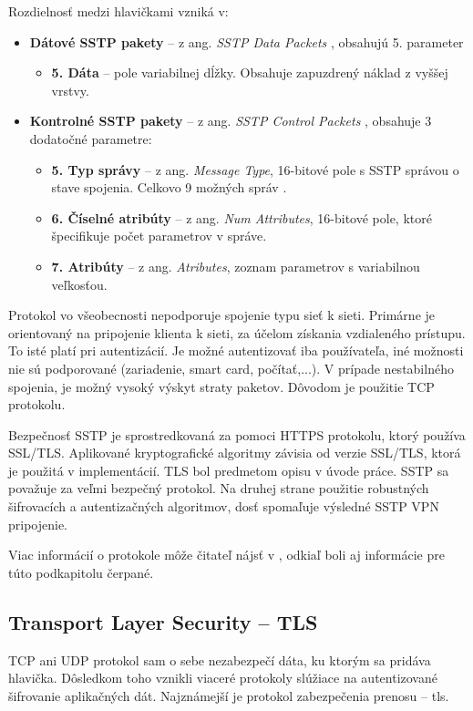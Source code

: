 Rozdielnosť medzi hlavičkami vzniká v:
\begin{itemize}
	\item{\textbf{Dátové SSTP pakety}} -- z ang. \textit{SSTP Data Packets} \cite{datpak}, obsahujú 5. parameter 
		\begin{itemize}
			\item{\textbf{5. Dáta}} -- pole variabilnej dĺžky. Obsahuje zapuzdrený náklad z vyššej vrstvy.
		\end{itemize} 
	\item{\textbf{Kontrolné SSTP pakety}} -- z ang. \textit{SSTP Control Packets} \cite{conpak}, obsahuje 3 dodatočné parametre:
		\begin{itemize}
			\item{\textbf{5. Typ správy}} -- z ang. \textit{Message Type}, 16-bitové pole s SSTP správou o stave spojenia. Celkovo 9 možných správ \cite{conpak}. 
			\item{\textbf{6. Číselné atribúty}} -- z ang. \textit{Num Attributes}, 16-bitové pole, ktoré špecifikuje počet parametrov v správe.
			\item{\textbf{7. Atribúty}} -- z ang. \textit{Atributes}, zoznam parametrov s variabilnou veľkosťou.
		\end{itemize}	
\end{itemize}   
 
Protokol vo všeobecnosti nepodporuje spojenie typu sieť k sieti. Primárne je orientovaný na pripojenie klienta k sieti, za účelom získania vzdialeného prístupu. To isté platí pri autentizácií. Je možné autentizovať iba používateľa, iné možnosti nie sú podporované (zariadenie, smart card, počítať,...). V prípade nestabilného spojenia, je možný vysoký výskyt straty paketov. Dôvodom je použitie TCP protokolu. 

Bezpečnosť SSTP je sprostredkovaná za pomoci HTTPS protokolu, ktorý používa SSL/TLS. Aplikované kryptografické algoritmy závisia od verzie SSL/TLS, ktorá je použitá v implementácií. TLS bol predmetom opisu v úvode práce. SSTP sa považuje za veľmi bezpečný protokol. Na druhej strane použitie robustných šifrovacích a autentizačných algoritmov, dosť spomaľuje výsledné SSTP VPN pripojenie.

Viac informácií o protokole môže čitateľ nájsť v \cite{mssstp}, odkiaľ boli aj informácie pre túto podkapitolu čerpané.  

\subsection{Transport Layer Security -- TLS}
TCP ani UDP protokol sam o sebe nezabezpečí dáta, ku ktorým sa pridáva hlavička. Dôsledkom toho vznikli viaceré protokoly slúžiace na autentizované šifrovanie aplikačných dát. Najznámejší je protokol zabezpečenia prenosu -- \acrshort{tls}. 

